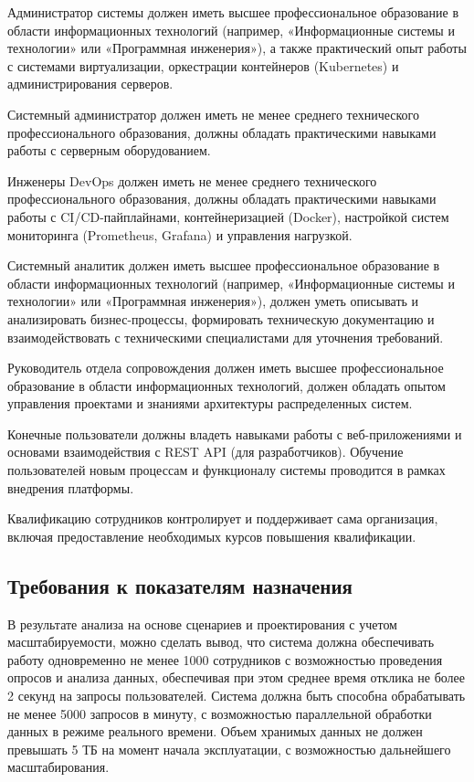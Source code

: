 Администратор системы должен иметь высшее профессиональное образование в области информационных технологий (например, «Информационные системы и технологии» или «Программная инженерия»), а также практический опыт работы с системами виртуализации, оркестрации контейнеров (Kubernetes) и администрирования серверов.


Системный администратор должен иметь не менее среднего технического профессионального образования, должны обладать практическими навыками работы с серверным оборудованием.

Инженеры DevOps должен иметь не менее среднего технического профессионального образования, должны обладать практическими навыками работы с CI/CD-пайплайнами, контейнеризацией (Docker), настройкой систем мониторинга (Prometheus, Grafana) и управления нагрузкой.

Системный аналитик должен иметь высшее профессиональное образование в области информационных технологий (например, «Информационные системы и технологии» или «Программная инженерия»),  должен уметь описывать и анализировать бизнес-процессы, формировать техническую документацию и взаимодействовать с техническими специалистами для уточнения требований.

Руководитель отдела сопровождения должен иметь высшее профессиональное образование в области информационных технологий, должен обладать опытом управления проектами и знаниями архитектуры распределенных систем. 

Конечные пользователи должны владеть навыками работы с веб-приложениями и основами взаимодействия с REST API (для разработчиков). Обучение пользователей новым процессам и функционалу системы проводится в рамках внедрения платформы.

Квалификацию сотрудников контролирует и поддерживает сама организация, включая предоставление необходимых курсов повышения квалификации.

\subsection{Требования к показателям назначения}

В результате анализа на основе сценариев и проектирования с учетом масштабируемости, можно сделать вывод, что система должна обеспечивать работу одновременно не менее 1000 сотрудников с возможностью проведения опросов и анализа данных, обеспечивая при этом среднее время отклика не более 2 секунд на запросы пользователей.
Система должна быть способна обрабатывать не менее 5000 запросов в минуту, с возможностью параллельной обработки данных в режиме реального времени. Объем хранимых данных не должен превышать 5 ТБ на момент начала эксплуатации, с возможностью дальнейшего масштабирования.

